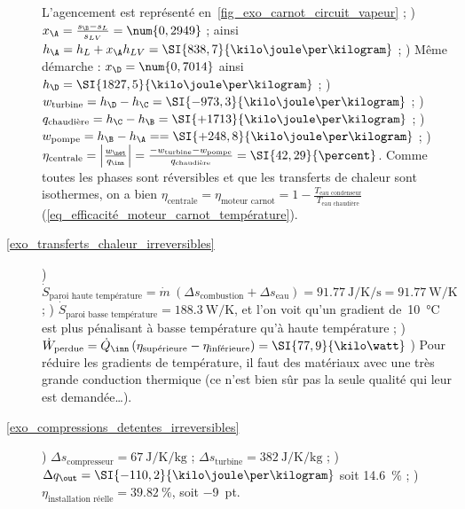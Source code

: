 \begin{description}
						\tab L’agencement est représenté en~\cref{fig_exo_carnot_circuit_vapeur} ;
						\tab{}) $x_\A = \frac{s_\B - s_L}{s_{LV}} = \num{0,2949}$ ; ainsi $h_\A = h_L + x_\A h_{LV} = \SI{838,7}{\kilo\joule\per\kilogram}$ ;
						) Même démarche : $x_\D = \num{0,7014}$ ainsi $h_\D = \SI{1827,5}{\kilo\joule\per\kilogram}$ ;
						) $w_\text{turbine} = h_\D - h_\C = \SI{-973,3}{\kilo\joule\per\kilogram}$ ;
						) $q_\text{chaudière} = h_\C - h_\B = \SI{+1713}{\kilo\joule\per\kilogram}$ ;
						) $w_\text{pompe} = h_\B - h_\A =  = \SI{+248,8}{\kilo\joule\per\kilogram}$ ;
						) $\eta_\text{centrale} = \left|\frac{w_\net}{q_\inn}\right| = \frac{-w_\text{turbine} - w_\text{pompe}}{q_\text{chaudière}} = \SI{42,29}{\percent}$. Comme toutes les phases sont réversibles et que les transferts de chaleur sont isothermes, on a bien $\eta_\text{centrale} = \eta_\text{moteur carnot} = 1 - \frac{T_\text{eau condenseur}}{T_\text{eau chaudière}}$ (\ref{eq_efficacité_moteur_carnot_température}).
		\item [\ref{exo_transferts_chaleur_irreversibles}]
						) $\dot{S}_\text{paroi haute température} = \dot{m} \ (\Delta s_\text{combustion} + \Delta s_\text{eau}) = \SI[per-mode = symbol]{+91,77}{\joule\per\kelvin\per\second} = \SI{+91,77}{\watt\per\kelvin}$ ;
						) $\dot{S}_\text{paroi basse\ température} = \SI{+188,3}{\watt\per\kelvin}$, et l’on voit qu’un gradient de~\SI{10}{\degreeCelsius} est plus pénalisant à basse température qu’à haute température ;
						) $\dot{W}_\text{perdue} = \dot Q_\inn \left(\eta_\text{supérieure} - \eta_\text{inférieure}\right) = \SI{77,9}{\kilo\watt}$
						) Pour réduire les gradients de température, il faut des matériaux avec une très grande conduction thermique (ce n’est bien sûr pas la seule qualité qui leur est demandée…).
		\item [\ref{exo_compressions_detentes_irreversibles}]
						) $\Delta s_\text{compresseur} = \SI{+67}{\joule\per\kelvin\per\kilogram}$ ; $\Delta s_\text{turbine} = \SI{+382}{\joule\per\kelvin\per\kilogram}$ ;
						) $\Delta q_\out = \SI{-110,2}{\kilo\joule\per\kilogram}$ soit \SI{+14,6}{\percent} ;
						) $\eta_\text{installation réelle} =\SI{39,82}{\percent}$, soit \SI{-9}{pt}.
	\end{description}
